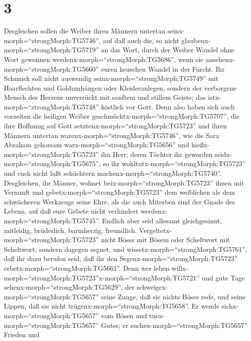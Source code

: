 \hypertarget{section-2}{%
\section{3}\label{section-2}}

 Desgleichen sollen die Weiber ihren Männern untertan
seinx-morph=``strongMorph:TG5746'', auf daß auch die, so nicht
glaubenx-morph=``strongMorph:TG5719'' an das Wort, durch der Weiber
Wandel ohne Wort gewonnen werdenx-morph=``strongMorph:TG5686'',
 wenn sie ansehenx-morph=``strongMorph:TG5660'' euren
keuschen Wandel in der Furcht.  Ihr Schmuck soll nicht
auswendig seinx-morph=``strongMorph:TG5749'' mit Haarflechten und
Goldumhängen oder Kleideranlegen,  sondern der verborgene
Mensch des Herzens unverrückt mit sanftem und stillem Geiste; das
istx-morph=``strongMorph:TG5748'' köstlich vor Gott.  Denn
also haben sich auch vorzeiten die heiligen Weiber
geschmücktx-morph=``strongMorph:TG5707'', die ihre Hoffnung auf Gott
setztenx-morph=``strongMorph:TG5723'' und ihren Männern untertan
warenx-morph=``strongMorph:TG5746'',  wie die Sara Abraham
gehorsam warx-morph=``strongMorph:TG5656'' und
hießx-morph=``strongMorph:TG5723'' ihn Herr; deren Töchter ihr geworden
seidx-morph=``strongMorph:TG5675'', so ihr
wohltutx-morph=``strongMorph:TG5723'' und euch nicht laßt schüchtern
machenx-morph=``strongMorph:TG5740''.  Desgleichen, ihr
Männer, wohnet beix-morph=``strongMorph:TG5723'' ihnen mit Vernunft und
gebetx-morph=``strongMorph:TG5723'' dem weiblichen als dem schwächeren
Werkzeuge seine Ehre, als die auch Miterben sind der Gnade des Lebens,
auf daß eure Gebete nicht verhindert
werdenx-morph=``strongMorph:TG5745''.  Endlich aber seid
allesamt gleichgesinnt, mitleidig, brüderlich, barmherzig, freundlich.
 Vergeltetx-morph=``strongMorph:TG5723'' nicht Böses mit
Bösem oder Scheltwort mit Scheltwort, sondern dagegen segnet, und
wissetx-morph=``strongMorph:TG5761'', daß ihr dazu berufen seid, daß ihr
den Segenx-morph=``strongMorph:TG5723''
erbetx-morph=``strongMorph:TG5661''.  Denn wer leben
willx-morph=``strongMorph:TG5723''x-morph=``strongMorph:TG5721'' und
gute Tage sehenx-morph=``strongMorph:TG5629'', der
schweigex-morph=``strongMorph:TG5657'' seine Zunge, daß sie nichts Böses
rede, und seine Lippen, daß sie nicht
trügenx-morph=``strongMorph:TG5658''.  Er wende
sichx-morph=``strongMorph:TG5657'' vom Bösen und
tuex-morph=``strongMorph:TG5657'' Gutes; er
suchex-morph=``strongMorph:TG5657'' Frieden und
